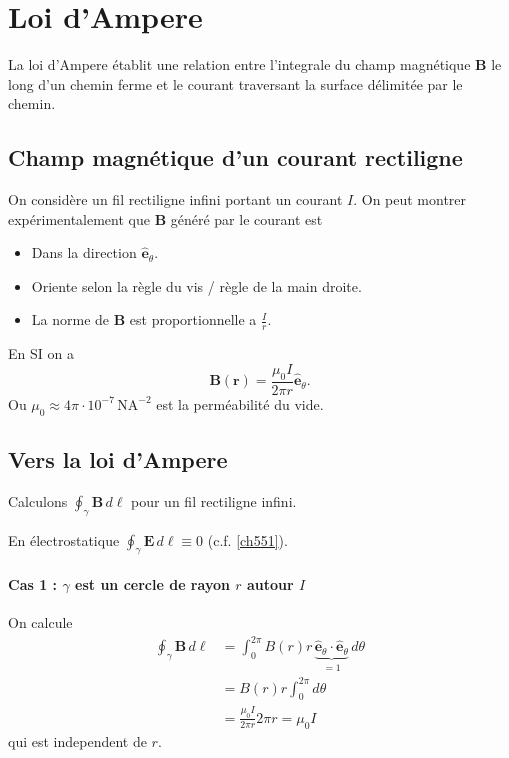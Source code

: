 \section{Loi d'Ampere}
La loi d'Ampere établit une relation entre l'integrale du champ magnétique $\boldsymbol{B}$ le long d'un chemin ferme et le courant traversant la surface délimitée par le chemin.
\subsection{Champ magnétique d'un courant rectiligne}
On considère un fil rectiligne infini portant un courant $I$. On peut montrer expérimentalement que $\boldsymbol{B}$ généré par le courant est 
\begin{itemize}
\item Dans la direction $\boldsymbol{\hat{e}}_{\theta}$.
\item Oriente selon la règle du vis / règle de la main droite.
\item La norme de $\boldsymbol{B}$ est proportionnelle a $\frac{I}{r}$. 
\end{itemize}
En SI on a
$$
\boldsymbol{B}(\boldsymbol{r})=\frac{\mu_{0}I}{2\pi r}\boldsymbol{\hat{e}}_{\theta}.
$$
Ou $\mu_{0}\approx 4\pi\cdot 10^{-7}\,\mathrm{NA}^{-2}$ est la perméabilité du vide. 
\subsection{Vers la loi d'Ampere}

Calculons $\oint _{\gamma}\boldsymbol{B}\,d\boldsymbol{\ell}$ pour un fil rectiligne infini.
\begin{reminder}
En électrostatique $\oint _{\gamma}\boldsymbol{E}\,d\boldsymbol{\ell}\equiv0$ (c.f. \ref{ch551}).
\end{reminder}
\paragraph{Cas 1 : $\gamma$ est un cercle de rayon $r$ autour $I$}
On calcule
\begin{align*}
\oint _{\gamma}\boldsymbol{B}\,d\boldsymbol{\ell} & =\int_{0}^{2\pi} B(r)r\,\underbrace{ \boldsymbol{\hat{e}}_{\theta}\cdot \boldsymbol{\hat{e}}_{\theta} }_{ =1 } \, d\theta \\
 & =B(r)r \int_{0}^{2\pi} d\theta \\
  & =\frac{\mu_{0}I}{2\pi r}2\pi r=\mu_{0}I
\end{align*}
qui est independent de $r$. 
